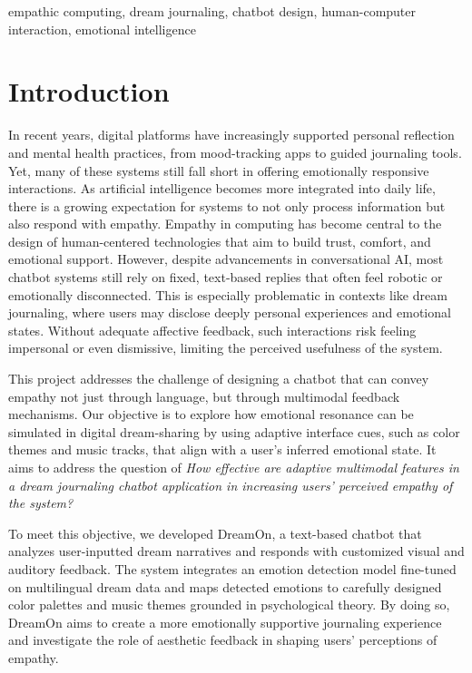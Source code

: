 \documentclass[conference]{IEEEtran}
\begin{document}
	\begin{IEEEkeywords}
		empathic computing, dream journaling, chatbot design, human-computer interaction, emotional intelligence
	\end{IEEEkeywords}
	
	\section{Introduction}
 	In recent years, digital platforms have increasingly supported personal reflection and mental health practices, from mood-tracking apps to guided journaling tools. Yet, many of these systems still fall short in offering emotionally responsive interactions. As artificial intelligence becomes more integrated into daily life, there is a growing expectation for systems to not only process information but also respond with empathy. Empathy in computing has become central to the design of human-centered technologies that aim to build trust, comfort, and emotional support. However, despite advancements in conversational AI, most chatbot systems still rely on fixed, text-based replies that often feel robotic or emotionally disconnected. This is especially problematic in contexts like dream journaling, where users may disclose deeply personal experiences and emotional states. Without adequate affective feedback, such interactions risk feeling impersonal or even dismissive, limiting the perceived usefulness of the system.

	This project addresses the challenge of designing a chatbot that can convey empathy not just through language, but through multimodal feedback mechanisms. Our objective is to explore how emotional resonance can be simulated in digital dream-sharing by using adaptive interface cues, such as color themes and music tracks, that align with a user's inferred emotional state. It aims to address the question of \textit{How effective are adaptive multimodal features in a dream journaling chatbot application in increasing users’ perceived empathy of the system?}

	To meet this objective, we developed DreamOn, a text-based chatbot that analyzes user-inputted dream narratives and responds with customized visual and auditory feedback. The system integrates an emotion detection model fine-tuned on multilingual dream data and maps detected emotions to carefully designed color palettes and music themes grounded in psychological theory. By doing so, DreamOn aims to create a more emotionally supportive journaling experience and investigate the role of aesthetic feedback in shaping users’ perceptions of empathy.
\end{document}
